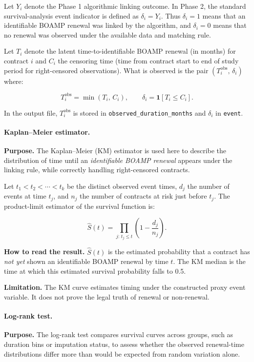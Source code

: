 \documentclass[12pt, a4paper]{article}
\begin{document}
Let $Y_i$ denote the Phase 1 algorithmic linking outcome. In Phase 2, the
standard survival-analysis event indicator is defined as $\delta_i = Y_i$.
Thus $\delta_i = 1$ means that an identifiable BOAMP renewal was linked by the
algorithm, and $\delta_i = 0$ means that no renewal was observed under the
available data and matching rule.

Let $T_i$ denote the latent time-to-identifiable BOAMP renewal (in months) for contract $i$ and
$C_i$ the censoring time (time from contract start to end of study period for
right-censored observations). What is observed is the pair
$(T_i^{\text{obs}},\, \delta_i)$ where:

\begin{equation}
  T_i^{\text{obs}} = \min(T_i,\, C_i),
  \qquad
  \delta_i = \mathbf{1}[T_i \leq C_i].
\end{equation}

In the output file, $T_i^{\text{obs}}$ is stored in
\texttt{observed\_duration\_months} and $\delta_i$ in \texttt{event}.

\paragraph{Kaplan--Meier estimator.}
\textbf{Purpose.} The Kaplan--Meier (KM) estimator is used here to describe the
distribution of time until an \emph{identifiable BOAMP renewal} appears under
the linking rule, while correctly handling right-censored contracts.

Let $t_1 < t_2 < \cdots < t_k$ be the distinct observed event times, $d_j$ the
number of events at time $t_j$, and $n_j$ the number of contracts at risk just
before $t_j$. The product-limit estimator of the survival function is:

\begin{equation}
  \hat{S}(t) = \prod_{j:\, t_j \leq t} \left(1 - \frac{d_j}{n_j}\right).
\end{equation}

\textbf{How to read the result.} $\hat{S}(t)$ is the estimated probability
that a contract has \emph{not yet} shown an identifiable BOAMP renewal by time
$t$. The KM median is the time at which this estimated survival probability
falls to 0.5.

\textbf{Limitation.} The KM curve estimates timing under the constructed proxy
event variable. It does not prove the legal truth of renewal or non-renewal.

\paragraph{Log-rank test.}
\textbf{Purpose.} The log-rank test compares survival curves across groups,
such as duration bins or imputation status, to assess whether the observed
renewal-time distributions differ more than would be expected from random
variation alone.
\end{document}
